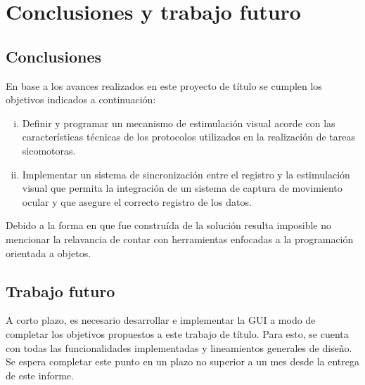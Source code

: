 \documentclass[\main/main.tex]{subfiles}
\begin{document}
\chapter{Conclusiones y trabajo futuro}
\label{cha:05_conclusiones_y_trabajo_futuro}
	\section{Conclusiones}
	\label{sec:05_conclusiones}
		En base a los avances realizados en este proyecto de título se cumplen los objetivos indicados a continuación: 
		\begin{enumerate}[(i)]\setlength\itemsep{-0.2em}
			\item Definir y programar un mecanismo de estimulación visual acorde con las características técnicas de los protocolos utilizados en la realización de tareas sicomotoras.
			
			\item Implementar un sistema de sincronización entre el registro y la estimulación visual que permita la integración de un sistema de captura de movimiento ocular y que asegure el correcto registro de los datos.

		\end{enumerate}

		Debido a la forma en que fue construída de la solución resulta imposible no mencionar la relavancia de contar con herramientas enfocadas a la programación orientada a objetos. 


	
	\section{Trabajo futuro}
	\label{sec:05_trabajo_futuro}
		A corto plazo, es necesario desarrollar e implementar la GUI a modo de completar los objetivos propuestos a este trabajo de título. Para esto, se cuenta con todas las funcionalidades implementadas y lineamientos generales de diseño. Se espera completar este punto en un plazo no superior a un mes desde la entrega de este informe.  
\end{document}
